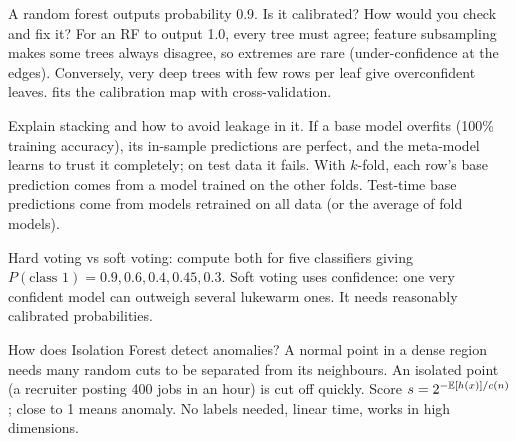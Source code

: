 \begin{qa}{\deep A random forest outputs probability 0.9. Is it calibrated? How would you check and fix it?}
\why For an RF to output 1.0, every tree must agree; feature subsampling makes some trees always disagree, so extremes are rare
(under-confidence at the edges). Conversely, very deep trees with few rows per leaf give overconfident leaves. 
fits the calibration map with cross-validation.
\end{qa}

\begin{qa}{Explain stacking and how to avoid leakage in it.}
\why If a base model overfits (100\% training accuracy), its in-sample predictions are perfect, and the meta-model learns to trust it
completely; on test data it fails. With $k$-fold, each row's base prediction comes from a model trained on the other folds. Test-time
base predictions come from models retrained on all data (or the average of fold models).
\end{qa}

\begin{qa}{Hard voting vs soft voting: compute both for five classifiers giving $P(\text{class }1) = 0.9, 0.6, 0.4, 0.45, 0.3$.}
\why Soft voting uses confidence: one very confident model can outweigh several lukewarm ones. It needs reasonably calibrated
probabilities.
\end{qa}

\begin{qa}{How does Isolation Forest detect anomalies?}
\why A normal point in a dense region needs many random cuts to be separated from its neighbours. An isolated point (a recruiter
posting 400 jobs in an hour) is cut off quickly. Score $s = 2^{-\mathbb{E}[h(x)]/c(n)}$; close to 1 means anomaly. No labels needed,
linear time, works in high dimensions.
\end{qa}


